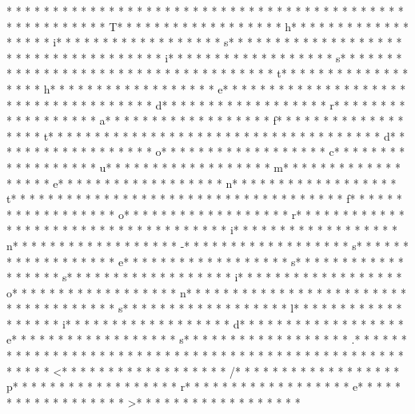 * * *  * * *  * * *  *  * * *  *  * * *  * 	* * *  * * *  * * *  *  * * *  *  * * *  * 	* * *  * * *  * * *  *  * * *  *  * * *  * T* * *  * * *  * * *  *  * * *  *  * * *  * h* * *  * * *  * * *  *  * * *  *  * * *  * i* * *  * * *  * * *  *  * * *  *  * * *  * s* * *  * * *  * * *  *  * * *  *  * * *  *  * * *  * * *  * * *  *  * * *  *  * * *  * i* * *  * * *  * * *  *  * * *  *  * * *  * s* * *  * * *  * * *  *  * * *  *  * * *  *  * * *  * * *  * * *  *  * * *  *  * * *  * t* * *  * * *  * * *  *  * * *  *  * * *  * h* * *  * * *  * * *  *  * * *  *  * * *  * e* * *  * * *  * * *  *  * * *  *  * * *  *  * * *  * * *  * * *  *  * * *  *  * * *  * d* * *  * * *  * * *  *  * * *  *  * * *  * r* * *  * * *  * * *  *  * * *  *  * * *  * a* * *  * * *  * * *  *  * * *  *  * * *  * f* * *  * * *  * * *  *  * * *  *  * * *  * t* * *  * * *  * * *  *  * * *  *  * * *  *  * * *  * * *  * * *  *  * * *  *  * * *  * d* * *  * * *  * * *  *  * * *  *  * * *  * o* * *  * * *  * * *  *  * * *  *  * * *  * c* * *  * * *  * * *  *  * * *  *  * * *  * u* * *  * * *  * * *  *  * * *  *  * * *  * m* * *  * * *  * * *  *  * * *  *  * * *  * e* * *  * * *  * * *  *  * * *  *  * * *  * n* * *  * * *  * * *  *  * * *  *  * * *  * t* * *  * * *  * * *  *  * * *  *  * * *  *  * * *  * * *  * * *  *  * * *  *  * * *  * f* * *  * * *  * * *  *  * * *  *  * * *  * o* * *  * * *  * * *  *  * * *  *  * * *  * r* * *  * * *  * * *  *  * * *  *  * * *  *  * * *  * * *  * * *  *  * * *  *  * * *  * i* * *  * * *  * * *  *  * * *  *  * * *  * n* * *  * * *  * * *  *  * * *  *  * * *  * -* * *  * * *  * * *  *  * * *  *  * * *  * s* * *  * * *  * * *  *  * * *  *  * * *  * e* * *  * * *  * * *  *  * * *  *  * * *  * s* * *  * * *  * * *  *  * * *  *  * * *  * s* * *  * * *  * * *  *  * * *  *  * * *  * i* * *  * * *  * * *  *  * * *  *  * * *  * o* * *  * * *  * * *  *  * * *  *  * * *  * n* * *  * * *  * * *  *  * * *  *  * * *  *  * * *  * * *  * * *  *  * * *  *  * * *  * s* * *  * * *  * * *  *  * * *  *  * * *  * l* * *  * * *  * * *  *  * * *  *  * * *  * i* * *  * * *  * * *  *  * * *  *  * * *  * d* * *  * * *  * * *  *  * * *  *  * * *  * e* * *  * * *  * * *  *  * * *  *  * * *  * s* * *  * * *  * * *  *  * * *  *  * * *  * .* * *  * * *  * * *  *  * * *  *  * * *  * 
* * *  * * *  * * *  *  * * *  *  * * *  * 	* * *  * * *  * * *  *  * * *  *  * * *  * <* * *  * * *  * * *  *  * * *  *  * * *  * /* * *  * * *  * * *  *  * * *  *  * * *  * p* * *  * * *  * * *  *  * * *  *  * * *  * r* * *  * * *  * * *  *  * * *  *  * * *  * e* * *  * * *  * * *  *  * * *  *  * * *  * >* * *  * * *  * * *  *  * * *  *  * * *  * 
